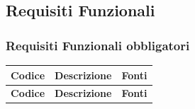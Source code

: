 \subsection{Requisiti Funzionali}

\subsubsection{Requisiti Funzionali obbligatori}
\renewcommand{\arraystretch}{1.15}
\begin{longtable}{|>{\raggedright}p{}|>{\raggedright\arraybackslash}p{}|>{\raggedright\arraybackslash}p{}|}

    \hline
    \rowcolor[gray]{0.9}
    \textbf{Codice} & \textbf{Descrizione} & \textbf{Fonti} \\
    \hline
    \endfirsthead
    
    \hline
    \rowcolor[gray]{0.9}
    \textbf{Codice} & \textbf{Descrizione} & \textbf{Fonti}  \\
    \hline
    \endhead


\end{longtable}
